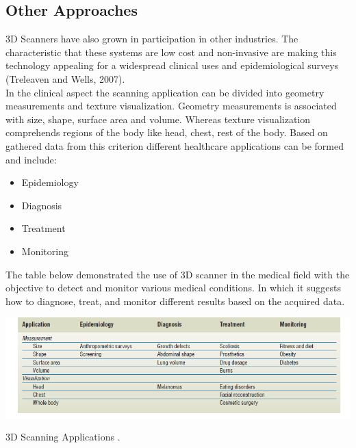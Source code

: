 \documentclass[a4paper]{article}
\begin{document}
 \subsection*{Other Approaches}
 3D Scanners have also grown in participation in other industries. The  characteristic that these systems are low cost and non-invasive are making this technology  appealing for a widespread clinical uses and epidemiological surveys (Treleaven and Wells, 2007).\\[10pt]
 In the clinical aspect the scanning application can be divided into geometry measurements and texture visualization. 
 Geometry measurements is associated with size, shape, surface area and volume. Whereas texture visualization comprehends regions of the body like head, chest, rest of the body.
 Based on gathered data from this criterion different healthcare applications can be formed and include: 
\begin{itemize}[]
    \itemsep0em 
    \item Epidemiology
    \item Diagnosis
    \item Treatment
    \item Monitoring
\end{itemize}
The table below demonstrated the use of 3D scanner in the medical field with the objective to detect and monitor various medical conditions. In which it suggests how to diagnose, treat, and monitor different results based on the acquired data.
\begin{table}[ht]
    \centering
    \includegraphics[width=17cm]{table1.png}
    \caption{3D Scanning Applications \cite[]{treleaven_wells_2007}.}
\end{table}
\end{document}
